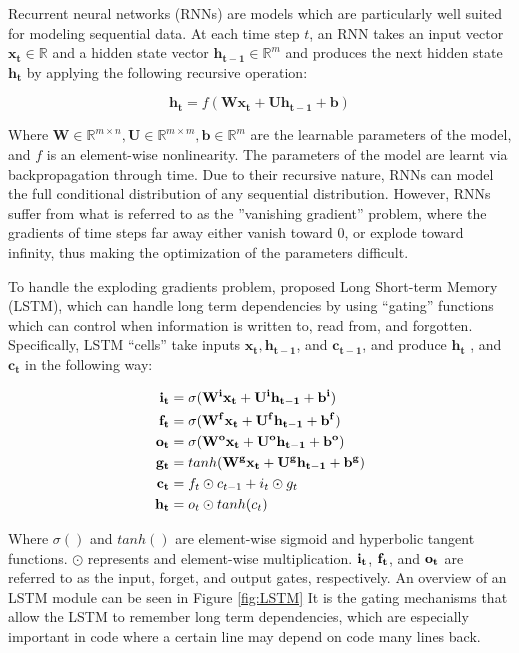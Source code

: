 \documentclass{article}
\begin{document}
Recurrent neural networks (RNNs) are models which are particularly well suited for modeling sequential data.
At each time step $t$, an RNN takes an input vector $\mathbf{x_t} \in \mathbb{R}$ and a hidden state vector $\mathbf{h_{t-1}} \in \mathbb{R}^m$ and produces the next hidden state $\mathbf{h_{t}}$ by applying the following recursive operation:

\begin{equation}
\mathbf{h_{t}} = f(\mathbf{Wx_{t }}+ \mathbf{Uh_{t-1}} + \mathbf{b})
\end{equation}

Where $\mathbf{W} \in \mathbb{R}^{m \times n}, \mathbf{U} \in \mathbb{R}^{m \times m}, \mathbf{b} \in \mathbb{R}^{m}$ are the learnable parameters of the model, and $f$ is an element-wise nonlinearity. The parameters of the model are learnt via backpropagation through time. Due to their recursive nature, RNNs can model the full conditional distribution of any sequential distribution. However, RNNs suffer from what is referred to as the ''vanishing gradient'' problem, where the gradients of time steps far away either vanish toward 0, or explode toward infinity, thus making the optimization of the parameters difficult.

To handle the exploding gradients problem, \cite{hochreiter1997long} proposed Long Short-term Memory (LSTM), which can handle long term dependencies by using ``gating'' functions which can control when information is written to, read from, and forgotten. Specifically, LSTM ``cells'' take inputs $\mathbf{x_t}, \mathbf{h_{t-1}} $, and $\mathbf{c_{t-1}} $, and produce $\mathbf{h_{t}}$ , and $\mathbf{c_{t}} $ in the following way:

\begin{align*}
\bf{i_t} &= \sigma(\bf{W^ix_t} + U^ih_{t-1} + b^i) \\
\bf{f_t} &= \sigma(\bf{W^fx_t} + U^fh_{t-1} + b^f) \\
\bf{o_t} &= \sigma(\bf{W^ox_t} + U^oh_{t-1} + b^o) \\
\bf{g_t} &= tanh(\bf{W^gx_t} + U^gh_{t-1} + b^g) \\
\bf{c_t} &= f_t \odot c_{t-1} + i_t \odot g_t \\
\bf{h_t} &= o_t \odot tanh(c_t)
\end{align*}

Where $\sigma()$ and $tanh()$ are element-wise sigmoid and hyperbolic tangent functions. $\odot$ represents and element-wise multiplication. $\bf{i_t}$, $\bf{f_t}$, and $\bf{o_t}$ are referred to as the input, forget, and output gates, respectively. An overview of an LSTM module can be seen in Figure \ref{fig:LSTM} It is the gating mechanisms that allow the LSTM to remember long term dependencies, which are especially important in code where a certain line may depend on code many lines back. 
\end{document}

